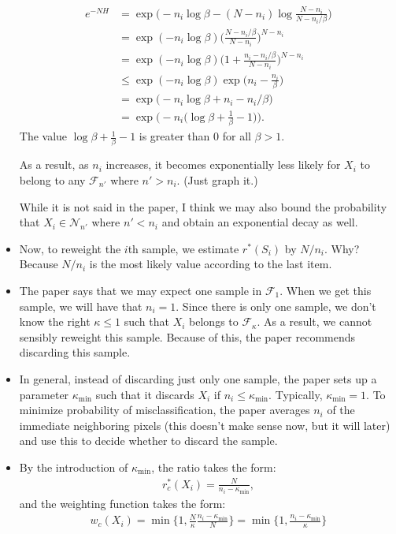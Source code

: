 \documentclass[10pt]{article}
\begin{document}
\begin{itemize}
\begin{align*}
  		e^{-NH}
  		&= \exp \bigg( -n_i \log \beta - (N-n_i) \log \frac{N-n_i}{N-n_i/\beta} \bigg)\\
  		&= \exp(-n_i \log\beta) \bigg( \frac{N-n_i/\beta}{N-n_i} \bigg)^{N-n_i} \\
  		&= \exp(-n_i \log\beta) \bigg( 1 + \frac{n_i-n_i/\beta}{N-n_i} \bigg)^{N-n_i}\\
  		&\leq \exp(-n_i \log\beta) \exp\bigg( n_i - \frac{n_i}{\beta} \bigg) \\
  		&= \exp \bigg( -n_i \log\beta + n_i - n_i/\beta \bigg) \\
  		&= \exp \bigg( -n_i \Big(\log\beta + \frac{1}{\beta} - 1\Big) \bigg).
  	\end{align*}
  	The value $\log\beta + \frac{1}{\beta} - 1$ is greater than $0$ for all $\beta > 1$.

  	As a result, as $n_i$ increases, it becomes exponentially less likely for $X_i$ to belong to any $\mathcal{F}_{n'}$ where $n' > n_i$. (Just graph it.)

  	While it is not said in the paper, I think we may also bound the probability that $X_i \in \mathcal{N}_{n'}$ where $n' < n_i$ and obtain an exponential decay as well.

  	\item Now, to reweight the $i$th sample, we estimate $r^*(S_i)$ by $N/n_i$. Why? Because $N/n_i$ is the most likely value according to the last item.

  	\item The paper says that we may expect one sample in $\mathcal{F}_1$. When we get this sample, we will have that $n_i = 1$. Since there is only one sample, we don't know the right $\kappa \leq 1$ such that $X_i$ belongs to $\mathcal{F}_\kappa$. As a result, we cannot sensibly reweight this sample. Because of this, the paper recommends discarding this sample. 

  	\item In general, instead of discarding just only one sample, the paper sets up a parameter $\kappa_{\min}$ such that it discards $X_i$ if $n_i \leq \kappa_{\min}$. Typically, $\kappa_{\min} = 1$. To minimize probability of misclassification, the paper averages $n_i$ of the immediate neighboring pixels (this doesn't make sense now, but it will later) and use this to decide whether to discard the sample.

  	\item By the introduction of $\kappa_{\min}$, the ratio takes the form:
  	\begin{align*}
  		r_c^*(X_i) = \frac{N}{n_i - \kappa_{\min}},
  	\end{align*}
  	and the weighting function takes the form:
  	\begin{align*}
  		w_c(X_i) 
  		= \min\bigg\{ 1, \frac{N}{\kappa} \frac{n_i-\kappa_{\min}}{N} \bigg\}
  		= \min\bigg\{ 1, \frac{n_i-\kappa_{\min}}{\kappa} \bigg\}
  	\end{align*}


\end{itemize}
\end{document}
